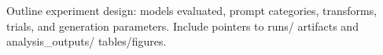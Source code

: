 Outline experiment design: models evaluated, prompt categories, transforms, trials, and generation parameters. Include pointers to runs/ artifacts and analysis_outputs/ tables/figures.
